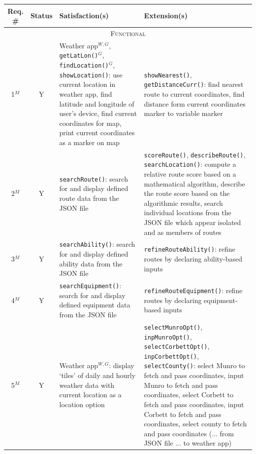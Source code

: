 \documentclass[11pt, english]{article}
\begin{document}
	\begin{center}
		\scriptsize
	\begin{longtable}{ccp{5.5cm}p{5.5cm}}
		Req. \# & Status & Satisfaction(s) & Extension(s)\\
		\hline
		\multicolumn{4}{c}{\textsc{Functional}}\\
		\hline
		1$^M$ & Y & Weather app$^{W,G}$, \texttt{getLatLon()}$^G$, \texttt{findLocation()}$^G$, \texttt{showLocation()}: use current location in weather app, find latitude and longitude of user's device, find current coordinates for map, print current coordinates as a marker on map & \texttt{showNearest()}, \texttt{getDistanceCurr()}: find nearest route to current coordinates, find distance form current coordinates marker to variable marker\\
		2$^M$ & Y & \texttt{searchRoute()}: search for and display defined route data from the JSON file & \texttt{scoreRoute()}, \texttt{describeRoute()}, \texttt{searchLocation()}: compute a relative route score based on a mathematical algorithm, describe the route score based on the algorithmic results, search individual locations from the JSON file which appear isolated and as members of routes\\
		3$^M$ & Y & \texttt{searchAbility()}: search for and display defined ability data from the JSON file & \texttt{refineRouteAbility()}: refine routes by declaring ability-based inputs\\
		4$^M$ & Y & \texttt{searchEquipment()}: search for and display defined equipment data from the JSON file & \texttt{refineRouteEquipment()}: refine routes by declaring equipment-based inputs\\
		5$^M$ & Y & Weather app$^{W,G}$: display `tiles' of daily and hourly weather data with current location as a location option & \texttt{selectMunroOpt()}, \texttt{inpMunroOpt()}, \texttt{selectCorbettOpt()}, \texttt{inpCorbettOpt()}, \texttt{selectCounty()}: select Munro to fetch and pass coordinates, input Munro to fetch and pass coordinates, select Corbett to fetch and pass coordinates, input Corbett to fetch and pass coordinates, select county to fetch and pass coordinates (... from JSON file ... to weather app)\\

\end{longtable}
\end{center}
\end{document}
